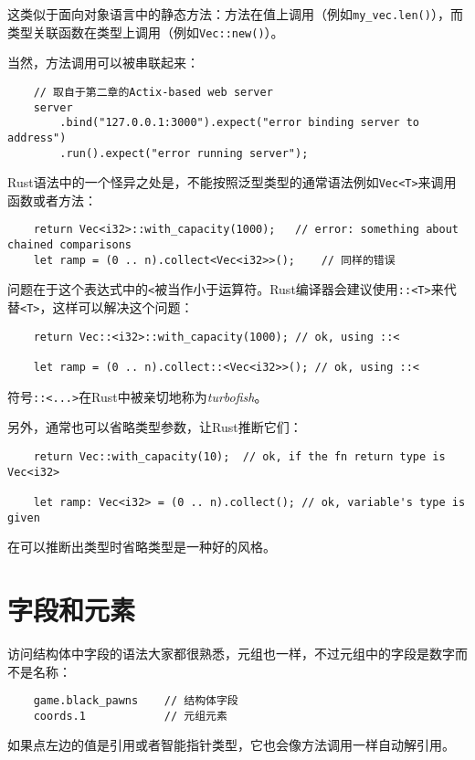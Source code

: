 这类似于面向对象语言中的静态方法：方法在值上调用（例如\texttt{my\_vec.len()}），而类型关联函数在类型上调用（例如\texttt{Vec::new()}）。

当然，方法调用可以被串联起来：
\begin{verbatim}
    // 取自于第二章的Actix-based web server
    server
        .bind("127.0.0.1:3000").expect("error binding server to address")
        .run().expect("error running server");
\end{verbatim}

Rust语法中的一个怪异之处是，不能按照泛型类型的通常语法例如\texttt{Vec<T>}来调用函数或者方法：
\begin{verbatim}
    return Vec<i32>::with_capacity(1000);   // error: something about chained comparisons
    let ramp = (0 .. n).collect<Vec<i32>>();    // 同样的错误
\end{verbatim}

问题在于这个表达式中的\texttt{<}被当作小于运算符。Rust编译器会建议使用\texttt{::<T>}来代替\texttt{<T>}，这样可以解决这个问题：
\begin{verbatim}
    return Vec::<i32>::with_capacity(1000); // ok, using ::<

    let ramp = (0 .. n).collect::<Vec<i32>>(); // ok, using ::<
\end{verbatim}

符号\texttt{::<...>}在Rust中被亲切地称为\emph{turbofish}。

另外，通常也可以省略类型参数，让Rust推断它们：
\begin{verbatim}
    return Vec::with_capacity(10);  // ok, if the fn return type is Vec<i32>

    let ramp: Vec<i32> = (0 .. n).collect(); // ok, variable's type is given
\end{verbatim}

在可以推断出类型时省略类型是一种好的风格。

\section{字段和元素}\label{field}

访问结构体中字段的语法大家都很熟悉，元组也一样，不过元组中的字段是数字而不是名称：
\begin{verbatim}
    game.black_pawns    // 结构体字段
    coords.1            // 元组元素
\end{verbatim}

如果点左边的值是引用或者智能指针类型，它也会像方法调用一样自动解引用。

